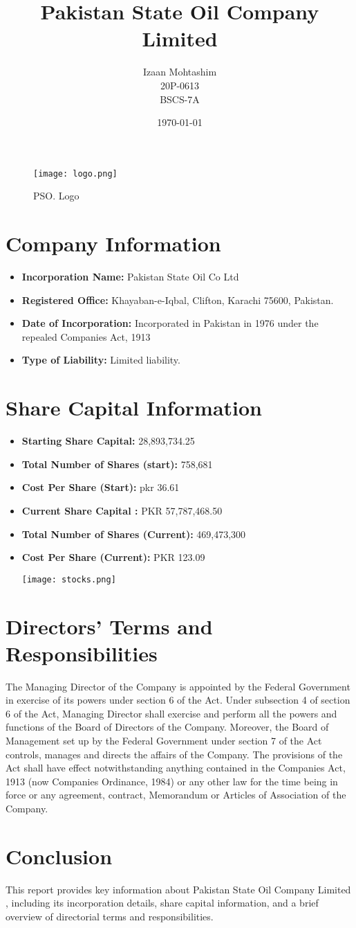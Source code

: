 \documentclass{article}
\author{Izaan Mohtashim \\ 20P-0613 \\ BSCS-7A}
\title{Pakistan State Oil Company Limited}
\date{\today}
\begin{document}
\maketitle
\begin{figure}[h]
    \centering
    \texttt{[image: logo.png]}
    \caption{PSO. Logo}
\end{figure}
\section*{Company Information}
\begin{itemize}
    \item \textbf{Incorporation Name:} Pakistan State Oil Co Ltd
    \item \textbf{Registered Office:} Khayaban-e-Iqbal, Clifton, Karachi 75600, Pakistan.
    \item \textbf{Date of Incorporation:} Incorporated in Pakistan in 1976 under the repealed Companies Act, 1913 
    \item \textbf{Type of Liability:} Limited liability.
\end{itemize}

\section*{Share Capital Information}
\begin{itemize}
    \item \textbf{Starting Share Capital:} 28,893,734.25
    \item \textbf{Total Number of Shares (start):} 758,681
    \item \textbf{Cost Per Share (Start):} pkr 36.61
    \item \textbf{Current Share Capital :} PKR 57,787,468.50
    \item \textbf{Total Number of Shares (Current):} 469,473,300
    \item \textbf{Cost Per Share (Current):} PKR 123.09

    \texttt{[image: stocks.png]}
\end{itemize}


\section*{Directors' Terms and Responsibilities}
The Managing Director of the Company is appointed by the Federal
Government in exercise of its powers under section 6 of the Act.
Under subsection 4 of section 6 of the Act, Managing Director shall
exercise and perform all the powers and functions of the Board of
Directors of the Company. Moreover, the Board of Management set
up by the Federal Government under section 7 of the Act controls,
manages and directs the affairs of the Company. The provisions of
the Act shall have effect notwithstanding anything contained in the
Companies Act, 1913 (now Companies Ordinance, 1984) or any
other law for the time being in force or any agreement, contract,
Memorandum or Articles of Association of the Company.

\section*{Conclusion}
This report provides key information about Pakistan State Oil Company Limited , including its incorporation details, share capital information, and a brief overview of directorial terms and responsibilities.
\end{document}

